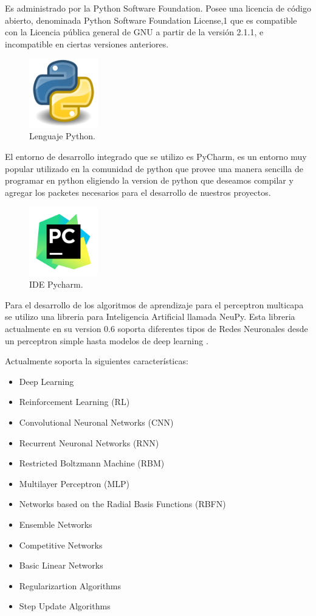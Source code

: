 \documentclass[12pt]{article}
\newcounter{subsubsubsection}[subsubsection]
\begin{document}
Es administrado por la Python Software Foundation. Posee una licencia de código abierto, denominada Python Software Foundation License,1 que es compatible con la Licencia pública general de GNU a partir de la versión 2.1.1, e incompatible en ciertas versiones anteriores.\cite{python}

\begin{figure}[h]
\includegraphics[width=3cm, height=3cm]{python}
\centering
\caption{Lenguaje Python.}
\label{fig:FUNCACT}
\end{figure}

El entorno de desarrollo integrado que se utilizo es PyCharm, es un entorno muy popular utilizado en la comunidad de python que provee una manera sencilla de programar en python eligiendo la version de python que deseamos compilar y agregar los packetes necesarios para el desarrollo de nuestros proyectos.

\begin{figure}[h]
\includegraphics[width=3cm, height=3cm]{pycharm}
\centering
\caption{IDE Pycharm.}
\label{fig:FUNCACT}
\end{figure}

Para el desarrollo de los algoritmos de aprendizaje para el perceptron multicapa se utilizo una libreria para Inteligencia Artificial llamada NeuPy. Esta libreria actualmente en su version 0.6 soporta diferentes tipos de Redes Neuronales desde un perceptron simple hasta modelos de deep learning \cite{neupy}.

Actualmente soporta la siguientes características:

\begin{itemize}
\item Deep Learning
\item Reinforcement Learning (RL)
\item Convolutional Neuronal Networks (CNN)
\item Recurrent Neuronal Networks (RNN)
\item Restricted Boltzmann Machine (RBM)
\item Multilayer Perceptron (MLP)
\item Networks based on the Radial Basis Functions (RBFN)
\item Ensemble Networks
\item Competitive Networks
\item Basic Linear Networks
\item Regularizartion Algorithms
\item Step Update Algorithms
\end{itemize}
\end{document}
